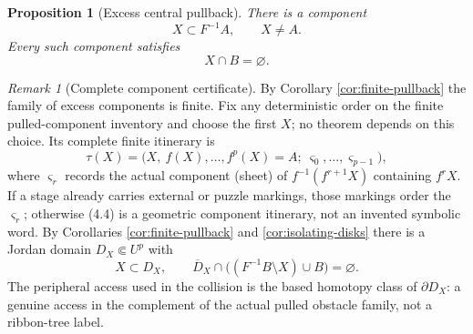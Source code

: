 \documentclass[11pt,reqno]{amsart}
\newtheorem{proposition}[theorem]{Proposition}
\theoremstyle{definition}
\theoremstyle{remark}
\newtheorem{remark}[theorem]{Remark}
\begin{document}
\begin{proposition}[Excess central pullback]\label{prop:excess}
There is a component
\[
 X\subset F^{-1}A,\qquad X\ne A.                    \tag{4.1}
\]
Every such component satisfies
\[
 X\cap B=\varnothing.                                \tag{4.2}
\]
\end{proposition}

\begin{remark}[Complete component certificate]\label{rem:certificate}
By Corollary \ref{cor:finite-pullback} the family of excess components is finite.  Fix any deterministic order on the finite pulled-component inventory and choose the first \(X\); no theorem depends on this choice.  Its complete finite itinerary is
\[
 \tau(X)=\bigl(X,\ f(X),\dots,f^p(X)=A;\ \varsigma_0,\dots,\varsigma_{p-1}\bigr),  \tag{4.4}
\]
where \(\varsigma_r\) records the actual component (sheet) of \(f^{-1}(f^{r+1}X)\) containing \(f^rX\).  If a stage already carries external or puzzle markings, those markings order the \(\varsigma_r\); otherwise (4.4) is a geometric component itinerary, not an invented symbolic word.  By Corollaries \ref{cor:finite-pullback} and \ref{cor:isolating-disks} there is a Jordan domain \(D_X\Subset U^p\) with
\[
 X\subset D_X,\qquad \overline D_X\cap\bigl((F^{-1}B\setminus X)\cup B\bigr)=\varnothing.  \tag{4.5}
\]
The peripheral access used in the collision is the based homotopy class of \(\partial D_X\): a genuine access in the complement of the actual pulled obstacle family, not a ribbon-tree label.
\end{remark}
\end{document}
